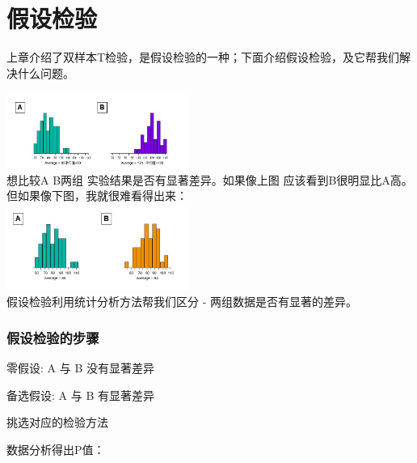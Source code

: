 \chapter{假设检验} %

上章介绍了双样本T检验，是假设检验的一种；下面介绍假设检验，及它帮我们解决什么问题。


\includegraphics[width=6cm]{CompareAB1Screenshot_2022-11-06_211947.jpg}\\

想比较A B两组 实验结果是否有显著差异。如果像上图
应该看到B很明显比A高。\\
但如果像下图，我就很难看得出来：\\


\includegraphics[width=6cm]{CompareAB2Screenshot_2022-11-06_212036.jpg}\\
假设检验利用统计分析方法帮我们区分 - 两组数据是否有显著的差异。

\hypertarget{ux5047ux8bbeux68c0ux9a8cux7684ux6b65ux9aa4}{%
\subsection{假设检验的步骤}\label{ux5047ux8bbeux68c0ux9a8cux7684ux6b65ux9aa4}}

零假设: A 与 B 没有显著差异

备选假设: A 与 B 有显著差异

挑选对应的检验方法

数据分析得出P值：

\begin{description}
\item[]
\end{description}



